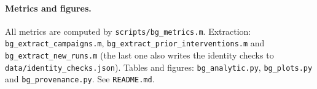 \documentclass[10pt,a4paper]{article}
\newcommand{\code}[1]{\texttt{\small #1}}
\begin{document}
\begin{table}[htb]\centering\scriptsize
\caption{Every new run. Overrides are applied on top of the named upstream preset (P: \code{duOlhoffAdaptivePedersen}; ladder: \code{duOlhoffFrozenM4}); cfg hash = first 12 hex digits of the effective-configuration SHA-256.}
\label{tab:prov}

\end{table}

\paragraph{Metrics and figures.} All metrics are computed by \code{scripts/bg\_metrics.m}. Extraction: \code{bg\_extract\_campaigns.m}, \code{bg\_extract\_prior\_interventions.m} and \code{bg\_extract\_new\_runs.m} (the last one also writes the identity checks to \code{data/identity\_checks.json}). Tables and figures: \code{bg\_analytic.py}, \code{bg\_plots.py} and \code{bg\_provenance.py}. See \code{README.md}.

\begin{table}[htb]\centering\scriptsize
\caption{Single-factor arms, terminal metrics (\code{data/new\_run\_metrics.csv}). spikes: outer iterations at which $\omega_1$ fell by more than 30\,\% from the previous iteration.}
\label{tab:arms}

\end{table}
\end{document}
